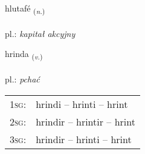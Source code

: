 \documentclass[frontgrid, backgrid]{flacards}\usepackage[]{graphicx}\usepackage[]{xcolor}
\begin{document}
\renewcommand{\flhead}{\vskip5pt \fboxsep=0pt {\small\bfseries\footnotesize Nafnorð | rzeczownik}}
\renewcommand{\fcfoot}{\vskip5pt \fboxsep=0pt \hspace{2pt}{\small\bfseries\footnotesize 3K}}

\renewcommand{\blhead}{\vskip5pt {\small\bfseries\footnotesize Nafnorð | rzeczownik }}
\renewcommand{\bcfoot}{\vskip5pt \hspace{2pt}{\small\bfseries\footnotesize 3K}}


{hlutafé \small{\textsubscript{(\textit{n.})}} \\[1ex] %
\textphonetic{[l̥ʏːtafjɛ]} \\
pl.: \emph{kapitał akcyjny} \\  [2ex]
\renewcommand*{\arraystretch}{0.8}
}

\renewcommand{\flhead}{\vskip5pt \fboxsep=0pt {\small\bfseries\footnotesize Sagnorð | czasownik}}
\renewcommand{\fcfoot}{\vskip5pt \fboxsep=0pt \hspace{2pt}{\small\bfseries\footnotesize 3K}}

\renewcommand{\blhead}{\vskip5pt {\small\bfseries\footnotesize Sagnorð | czasownik }}
\renewcommand{\bcfoot}{\vskip5pt \hspace{2pt}{\small\bfseries\footnotesize 3K}}


{hrinda \small{\textsubscript{(\textit{v.})}} \\[1ex] %
\textphonetic{[r̥ɪnta]} \\
pl.: \emph{pchać} \\  [2ex]
\renewcommand*{\arraystretch}{0.8}
\begin{tabular}{p{1cm}l}
\textsc{1sg}: & hrindi -- hrinti -- hrint \\ 
\textsc{2sg}: & hrindir -- hrintir -- hrint \\ 
\textsc{3sg}: & hrindir -- hrinti -- hrint \\ 
\end{tabular}
}
\end{document}
